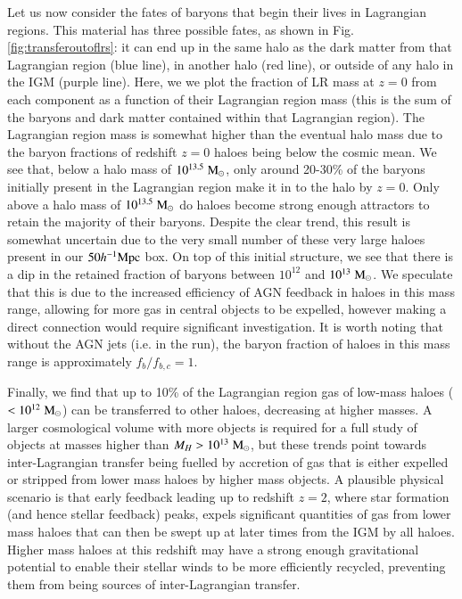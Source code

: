 Let us now consider the fates of baryons that begin their lives in Lagrangian
regions. This material has three possible fates, as shown in Fig.
\ref{fig:transferoutoflrs}: it can end up in the same halo as the dark matter
from that Lagrangian region (blue line), in another halo (red line), or
outside of any halo in the IGM (purple line). Here, we we plot the fraction
of LR mass at $z=0$ from each component as a function of their Lagrangian
region mass (this is the sum of the baryons and dark matter contained within
that Lagrangian region). The Lagrangian region mass is somewhat higher than
the eventual halo mass due to the baryon fractions of redshift $z=0$ haloes
being below the cosmic mean. We see that, below a halo mass of
$10^{13.5}\;{\rm M}_{\odot}{}$, only around 20-30\% of the baryons initially present in
the Lagrangian region make it in to the halo by $z=0$. Only above a halo mass
of $10^{13.5}\;{\rm M}_{\odot}{}$ do haloes become strong enough attractors to retain
the majority of their baryons. Despite the clear trend, this result is
somewhat uncertain due to the very small number of these very large haloes
present in our $50h^{-1}{\rm Mpc}{}$ box. On top of this initial structure, we see that
there is a dip in the retained fraction of baryons between $10^{12}$ and
$10^{13}\;{\rm M}_{\odot}{}$. We speculate that this is due to the increased efficiency
of AGN feedback in haloes in this mass range, allowing for more gas in
central objects to be expelled, however making a direct connection would
require significant investigation. It is worth noting that without the AGN
jets (i.e. in the \nojet{} run), the baryon fraction of haloes in this mass
range is approximately $f_b / f_{b,c} = 1$.


Finally, we find that up to 10\% of the Lagrangian region gas of low-mass
haloes ($<10^{12} \;{\rm M}_{\odot}{}$) can be transferred to other haloes, decreasing at
higher masses. A larger cosmological volume with more objects is required for
a full study of objects at masses higher than $M_H > 10^{13}\;{\rm M}_{\odot}{}$, but
these trends point towards inter-Lagrangian transfer being fuelled by
accretion of gas that is either expelled or stripped from lower mass haloes
by higher mass objects. A plausible physical scenario is that early
feedback leading up to redshift $z=2$, where star formation (and hence
stellar feedback) peaks, expels significant quantities of gas from lower mass
haloes that can then be swept up at later times from the IGM by all haloes.
Higher mass haloes at this redshift may have a strong enough gravitational
potential to enable their stellar winds to be more efficiently recycled,
preventing them from being sources of inter-Lagrangian transfer.

